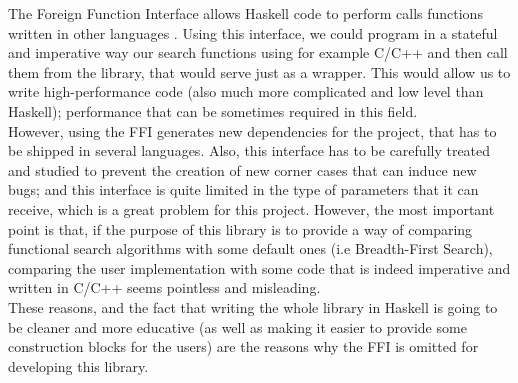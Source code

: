 The Foreign Function Interface allows Haskell code to perform calls functions
written in other languages \cite{haskell98-ffi}. Using this interface, we could
program in a stateful and imperative way our search functions using for example
C/C++ and then call them from the library, that would serve just as a wrapper.
This would allow us to write high-performance code (also much more complicated
and low level than Haskell); performance that can be sometimes required in
this field.\\

However, using the FFI generates new dependencies for the project, that has to
be shipped in several languages. Also, this interface has to be carefully
treated and studied to prevent the creation of new corner cases that can induce
new bugs; and this interface is quite limited in the type of parameters that it
can receive, which is a great problem for this project. However, the most
important point is that, if the purpose of this library is to provide a way of
comparing functional search algorithms with some default ones (i.e
Breadth-First Search), comparing the user implementation with some code that is
indeed imperative and written in C/C++ seems pointless and misleading.\\

These reasons, and the fact that writing the whole library in Haskell is going
to be cleaner and more educative (as well as making it easier to provide some
construction blocks for the users) are the reasons why the FFI is omitted for
developing this library.\\

\newpage